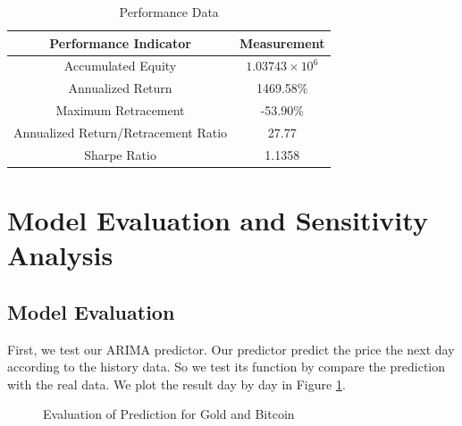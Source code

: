 \documentclass[12pt,a4paper]{article}
\newcommand{\Predictor}{ARIMA }
\begin{document}
\begin{spacing}{1.2}
\begin{table}[H]
	\renewcommand{\arraystretch}{1.5}
	\caption{Performance Data}
	\label{table:performance}
	\begin{center}
		{\footnotesize
			\begin{tabular}{c c }
				\toprule
				Performance Indicator & Measurement\\
				\midrule
				Accumulated Equity & $1.03743 \times 10^6$ \\
				Annualized Return & 1469.58\% \\
				Maximum Retracement & -53.90\% \\
				Annualized Return/Retracement Ratio & 27.77 \\
				Sharpe Ratio & 1.1358 \\
				\bottomrule
		\end{tabular}}
	\end{center}	
\end{table}



\section{Model Evaluation and Sensitivity Analysis}
\label{SensitivityAnalysis}

\subsection{Model Evaluation}

First, we test our \Predictor predictor. Our predictor predict the price the next day according to the history data. So we test its function by compare the prediction with the real data. We plot the result day by day in Figure \ref{fig:pred_evaluation}. 

\begin{figure}
	\begin{center}
		\caption{Evaluation of Prediction for Gold and Bitcoin}
		\label{fig:pred_evaluation}
	\end{center}
\end{figure}



\end{spacing}
\end{document}
